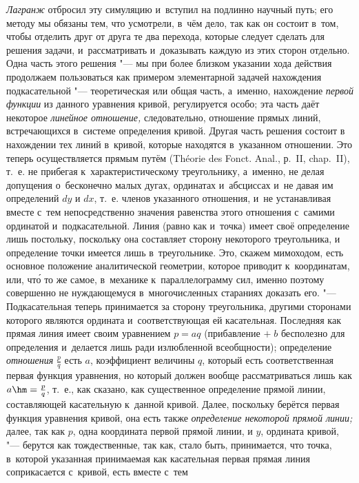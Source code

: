 {\em Лагранж} отбросил эту симуляцию и~вступил на подлинно научный путь; его
методу мы обязаны тем, что усмотрели, в~чём дело, так как он состоит в~том,
чтобы отделить друг от друга те два перехода, которые следует сделать для
решения задачи, и~рассматривать и~доказывать каждую из этих сторон отдельно.
Одна часть этого решения "--- мы при более близком указании хода действия
продолжаем пользоваться как примером элементарной задачей нахождения
подкасательной "--- теоретическая или общая часть, а~именно, нахождение
{\em первой функции} из данного уравнения кривой, регулируется особо; эта часть
даёт некоторое {\em линейное отношение,} следовательно, отношение прямых линий,
встречающихся в~системе определения кривой. Другая часть решения состоит в
нахождении тех линий в~кривой, которые находятся в~указанном отношении. Это
теперь осуществляется прямым путём (Théorie des Fonct. Anal., р.~II, chap.~II),
т.~е. не прибегая к~характеристическому треугольнику, а~именно, не делая
допущения о~бесконечно малых дугах, ординатах и~абсциссах и~не давая им
определений $dy$ и $dx$, т.~е. членов указанного отношения, и~не устанавливая
вместе с~тем непосредственно значения равенства этого отношения с~самими
ординатой и~подкасательной. Линия (равно как и~точка) имеет своё определение
лишь постольку, поскольку она составляет сторону некоторого треугольника, и
определение точки имеется лишь в~треугольнике. Это, скажем мимоходом, есть
основное положение аналитической геометрии, которое приводит к~координатам,
или, чт\'{о} то же самое, в~механике к~параллелограмму сил, именно поэтому
совершенно не нуждающемуся в~многочисленных стараниях доказать его. "---
Подкасательная теперь принимается за сторону треугольника, другими сторонами
которого являются ордината и~соответствующая ей касательная. Последняя как
прямая линия имеет своим уравнением $p=aq$ (прибавление $+\;b$ бесполезно для
определения и~делается лишь ради излюбленной всеобщности); определение
{\em отношения} $\frac p q$ есть $a$, коэффициент величины $q$, который есть
соответственная первая функция уравнения, но который должен вообще
рассматриваться лишь как $a\hm=\frac p q$, т.~е., как сказано, как существенное
определение прямой линии, составляющей касательную к~данной кривой. Далее,
поскольку берётся первая функция уравнения кривой, она есть также
{\em определение некоторой прямой линии;} далее, так как $p$, одна координата
первой прямой линии, и $y$, ордината кривой, "--- берутся как тождественные,
так как, стало быть, принимается, что точка, в~которой указанная принимаемая
как касательная первая прямая линия соприкасается с~кривой, есть вместе с~тем
